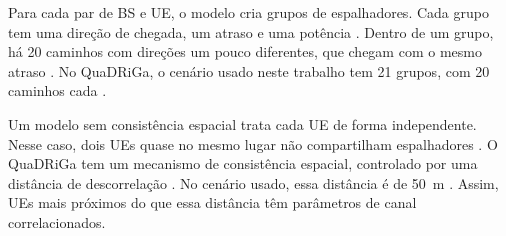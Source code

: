 Para cada par de BS e UE, o modelo cria grupos de espalhadores. Cada grupo tem uma direção de chegada, um atraso e uma potência \cite[p.~341]{bjornson-mimo}. Dentro de um grupo, há 20 caminhos com direções um pouco diferentes, que chegam com o mesmo atraso \cite[p.~341--342]{bjornson-mimo}. No QuaDRiGa, o cenário usado neste trabalho tem 21 grupos, com 20 caminhos cada \cite{quadriga-manual}.

Um modelo sem consistência espacial trata cada UE de forma independente. Nesse caso, dois UEs quase no mesmo lugar não compartilham espalhadores \cite[p.~342]{bjornson-mimo}. O QuaDRiGa tem um mecanismo de consistência espacial, controlado por uma distância de descorrelação \cite{quadriga-manual}. No cenário usado, essa distância é de 50~m \cite{quadriga-manual}. Assim, UEs mais próximos do que essa distância têm parâmetros de canal correlacionados.



